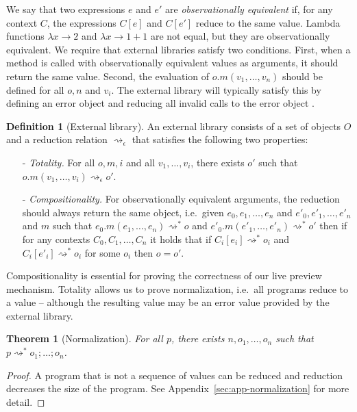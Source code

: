 \documentclass[english,submission]{programming}
\newcounter{thc}
\newcounter{dfc}
\theoremstyle{plain}
\newtheorem{theorem}[thc]{Theorem}
\theoremstyle{definition}
\newtheorem{definition}[dfc]{Definition}
\begin{document}
\noindent
We say that two expressions
$e$ and $e'$ are \emph{observationally equivalent} if, for any context $C$, the expressions $C[e]$ and
$C[e']$ reduce to the same value. Lambda functions $\lambda x\!\rightarrow\!2$ and
$\lambda x\!\rightarrow\!1\!+\!1$ are not equal, but they are observationally equivalent.
We require that external libraries satisfy two conditions. First, when a method is called with
observationally equivalent values as arguments, it should return the same value. Second, the
evaluation of $o.m(v_1,\ldots,v_n)$ should be defined for all $o, n$ and $v_i$. The external
library will typically satisfy this by defining an error object and reducing all invalid calls
to the error object \cite{gowrong}.

\begin{definition}[External library]
\label{def:external}
An external library consists of a set of objects $O$ and a reduction relation
$\rightsquigarrow_\epsilon$ that satisfies the following two properties:
\begin{itemize}
\item[-] \emph{Totality.} For all $o, m, i$ and all $v_1, \ldots, v_i$, there exists $o'$ such
  that $o.m(v_1, \ldots, v_i) \rightsquigarrow_\epsilon o'$.
\item[-] \emph{Compositionality.} For observationally equivalent arguments, the reduction should always return
  the same object, i.e.~given $e_0, e_1, \ldots, e_n$ and $e'_0, e'_1, \ldots, e'_n$ and $m$ such that
  $e_0.m(e_1, \ldots, e_n) \rightsquigarrow^{*} o$ and $e'_0.m(e'_1, \ldots, e'_n) \rightsquigarrow^{*} o'$ then
  if for any contexts $C_0, C_1, \ldots, C_n$ it holds that if $C_i[e_i] \rightsquigarrow^{*} o_i$ and
  $C_i[e'_i] \rightsquigarrow^{*} o_i$ for some $o_i$ then $o = o'$.
\end{itemize}
\end{definition}

\noindent
Compositionality is essential for proving the correctness of our live preview mechanism.
Totality allows us to prove normalization, i.e.~all programs reduce to
a value -- although the resulting value may be an error value provided by the external library.

\begin{theorem}[Normalization]
\label{thm:normalization}
For all $p$, there exists $n, o_1, \ldots, o_n$ such that $p\rightsquigarrow^{*} o_1;\ldots;o_n$.
\end{theorem}
\begin{proof}
A program that is not a sequence of values can be reduced and reduction decreases the size of the
program. See Appendix~\ref{sec:app-normalization} for more detail.
\end{proof}
\end{document}
